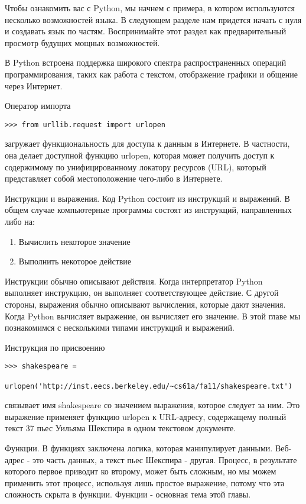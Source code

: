 Чтобы ознакомить вас с Python, мы начнем с примера, в котором используются несколько возможностей языка. В следующем разделе нам придется начать с нуля и создавать язык по частям. Воспринимайте этот раздел как предварительный просмотр будущих мощных возможностей.

В Python встроена поддержка широкого спектра распространенных операций программирования, таких как работа с текстом, отображение графики и общение через Интернет.

Оператор импорта

\begin{verbatim}
>>> from urllib.request import urlopen
\end{verbatim}

загружает функциональность для доступа к данным в Интернете. В частности, она делает доступной функцию urlopen, которая может получить доступ к содержимому по унифицированному локатору ресурсов (URL), который представляет собой местоположение чего-либо в Интернете.

Инструкции и выражения. Код Python состоит из инструкций и выражений. В общем случае компьютерные программы состоят из инструкций, направленных либо на:

\begin{enumerate}
  \item Вычислить некоторое значение
  \item Выполнить некоторое действие
\end{enumerate}

Инструкции обычно описывают действия. Когда интерпретатор Python выполняет инструкцию, он выполняет соответствующее действие. С другой стороны, выражения обычно описывают вычисления, которые дают значения. Когда Python вычисляет выражение, он вычисляет его значение. В этой главе мы познакомимся с несколькими типами инструкций и выражений.

Инструкция по присвоению

\begin{verbatim}
>>> shakespeare =
    urlopen('http://inst.eecs.berkeley.edu/~cs61a/fa11/shakespeare.txt')
\end{verbatim}

связывает имя shakespeare со значением выражения, которое следует за ним. Это выражение применяет функцию urlopen к URL-адресу, содержащему полный текст 37 пьес Уильяма Шекспира в одном текстовом документе.

Функции.
В функциях заключена логика, которая манипулирует данными.
Веб-адрес - это часть данных, а текст пьес Шекспира - другая.
Процесс, в результате которого первое приводит ко второму, может быть сложным, но мы можем применить этот процесс, используя лишь простое выражение, потому что эта сложность скрыта в функции.
Функции - основная тема этой главы.

